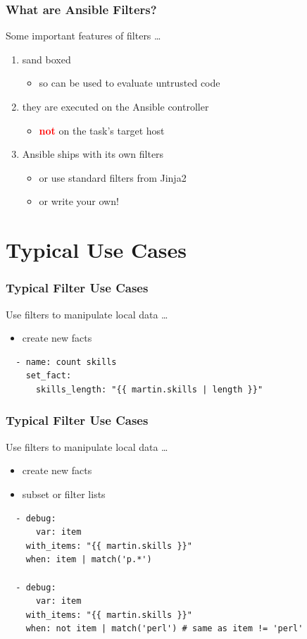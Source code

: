 \documentclass[pdf]{beamer}
\begin{document}
\begin{frame}
  \frametitle{What are Ansible Filters?}
  Some important features of filters \ldots
  \pause{}
  \begin{enumerate}
    \item<+->{sand boxed}
      \begin{itemize}
        \item<+->{so can be used to evaluate untrusted code}
      \end{itemize}
    \item<+->{they are executed on the Ansible controller}
      \begin{itemize}
        \item<+->{\textcolor{red}{\textbf{not}} on the task's target host}
      \end{itemize}
    \item<+->{Ansible ships with its own filters}
      \begin{itemize}
        \item<+->{or use standard filters from Jinja2}
        \item<+->{or write your own!}
      \end{itemize}
  \end{enumerate}
\end{frame}

\section{Typical Use Cases}

\begin{frame}[fragile]
  \frametitle{Typical Filter Use Cases}
  Use filters to manipulate local data \ldots
  \pause{}
  \begin{itemize}[<+->]
    \item \alert {create new facts}
  \end{itemize}
  \begin{lstlisting}
  - name: count skills
    set_fact:
      skills_length: "{{ martin.skills | length }}"
  \end{lstlisting}
\end{frame}

\begin{frame}[fragile]
  \frametitle{Typical Filter Use Cases}
  Use filters to manipulate local data \ldots
  \begin{itemize}
    \item {create new facts}
    \item \alert {subset or filter lists}
  \end{itemize}
  \begin{lstlisting}
  - debug:
      var: item
    with_items: "{{ martin.skills }}"
    when: item | match('p.*')

  - debug:
      var: item
    with_items: "{{ martin.skills }}"
    when: not item | match('perl') # same as item != 'perl'
  \end{lstlisting}
\end{frame}
\end{document}
